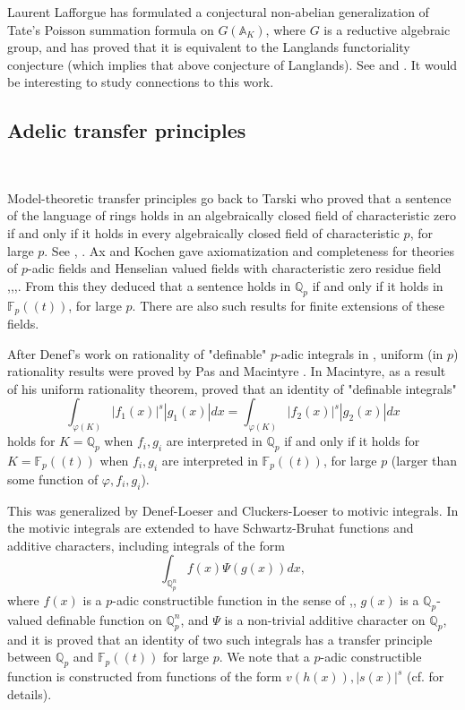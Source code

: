\documentclass[12pt]{amsart}
\def\A{\mathbb{A}}
\def\F{\mathbb{F}}
\def\Q{\mathbb{Q}}
\def\F{\mathbb{F}}
\numberwithin{equation}{section}
\begin{document}
Laurent Lafforgue has formulated a conjectural non-abelian generalization of Tate's Poisson summation formula on $G(\A_K)$, where $G$ is a reductive algebraic group, and has proved that it is equivalent to the 
Langlands functoriality conjecture (which implies that above conjecture of Langlands). See \cite{laff-nott} and \cite{laff-intro}. 
It would be interesting to study connections to this work.

\medskip

\subsection{\bf Adelic transfer principles}\label{ssec-transfer}

\

\medskip

Model-theoretic transfer principles go back to Tarski who proved that a sentence of the language of rings holds in an algebraically closed field of characteristic zero if and only if it holds in every algebraically closed field of characteristic $p$, for large $p$. See \cite{cherlin}, \cite{KK}. Ax and Kochen gave axiomatization and completeness for theories of $p$-adic fields and Henselian valued fields with characteristic zero residue field \cite{AK1},\cite{AK2},\cite{AK3},\cite{cherlin}. 
From this they deduced that a sentence holds in $\Q_p$ if and only if it holds in $\F_p((t))$, for large $p$. There are also such results for finite extensions of these fields. 

After Denef's work on rationality of "definable" $p$-adic integrals in \cite{Denefrationality}, uniform (in $p$) rationality results were proved by Pas \cite{pas} and Macintyre \cite{Macintyre2}. In \cite{Macintyre2} Macintyre, as a result of his uniform rationality theorem, proved that an identity of "definable integrals" 
$$\int_{\varphi(K)} |f_1(x)|^s|g_1(x)| dx=\int_{\varphi(K)}|f_2(x)|^s|g_2(x)| dx$$
holds for $K=\Q_p$ when $f_i,g_i$ are interpreted in $\Q_p$ if and only if
it holds for $K=\F_p((t))$ when $f_i,g_i$ are interpreted in $\F_p((t))$, for large $p$ (larger than some function of $\varphi,f_i,g_i$).

This was generalized by Denef-Loeser \cite{DL} and Cluckers-Loeser \cite{CL2} to motivic integrals. In \cite{CL2} the motivic integrals are extended to have Schwartz-Bruhat functions and additive characters, including integrals of the form 
$$\int_{\Q_p^n} f(x) \Psi(g(x)) dx,$$
where $f(x)$ is a $p$-adic constructible function in the sense of \cite{CL1},\cite{CL2}, $g(x)$ is a $\Q_p$-valued definable function on $\Q_p^n$, and $\Psi$ is a non-trivial additive character on $\Q_p$, and it is proved that an identity of two such integrals  has a transfer principle between $\Q_p$ and $\F_p((t))$ for large $p$. We note that a $p$-adic constructible function is constructed from functions of the form $v(h(x)),|s(x)|^s$ (cf. \cite{CL2} for details).
\end{document}
